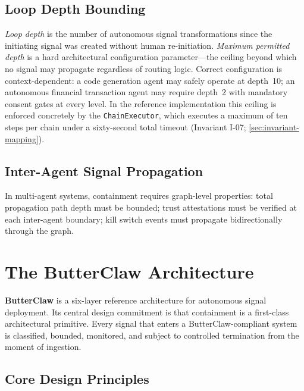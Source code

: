 \documentclass[11pt,a4paper]{article}
\begin{document}
\subsection{Loop Depth Bounding}

\emph{Loop depth} is the number of autonomous signal transformations since the initiating signal
was created without human re-initiation. \emph{Maximum permitted depth} is a hard architectural
configuration parameter---the ceiling beyond which no signal may propagate regardless of routing
logic. Correct configuration is context-dependent: a code generation agent may safely operate at
depth~10; an autonomous financial transaction agent may require depth~2 with mandatory consent
gates at every level. In the reference implementation this ceiling is enforced concretely by the
\texttt{ChainExecutor}, which executes a maximum of ten steps per chain under a sixty-second total
timeout (Invariant I-07; \cref{sec:invariant-mapping}).

\subsection{Inter-Agent Signal Propagation}

In multi-agent systems, containment requires graph-level properties: total propagation path depth
must be bounded; trust attestations must be verified at each inter-agent boundary; kill switch
events must propagate bidirectionally through the graph.

\section{The ButterClaw Architecture}
\label{sec:butterclaw}

\begin{definitionbox}[title=Definition 5.1 --- ButterClaw]
\textbf{ButterClaw} is a six-layer reference architecture for autonomous signal deployment.
Its central design commitment is that containment is a first-class architectural primitive.
Every signal that enters a ButterClaw-compliant system is classified, bounded, monitored, and
subject to controlled termination from the moment of ingestion.
\end{definitionbox}

\subsection{Core Design Principles}
\end{document}
